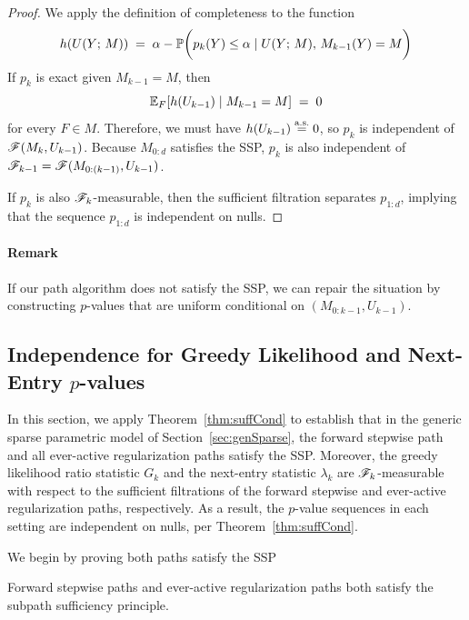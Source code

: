 \documentclass{article}
\begin{document}
\begin{proof}
We apply the definition of completeness to the function 
\[
h(U(Y; \, M)) \;=\; 
\alpha - \P\bigg(p_k(Y) \leq \alpha \mid U(Y; \, M), \, M_{k-1}(Y) = M\bigg)
\]
If $p_k$ is exact given $M_{k-1} = M$, then 
\[
\E_F[h(U_{k-1}) \mid M_{k-1}=M] \;=\; 0
\] 
for every $F\in M$. Therefore, we must have $h(U_{k-1})\eqAS 0$, so $p_k$ is independent of $\sF(M_k, U_{k-1})$. Because $M_{0:d}$ satisfies the SSP, $p_k$ is also independent of $\sF_{k-1} = \sF(M_{0:(k-1)}, U_{k-1})$.

If $p_k$ is also $\sF_k$-measurable, then the sufficient filtration separates $p_{1:d}$, implying that the sequence $p_{1:d}$ is independent on nulls.
\end{proof}

\paragraph{Remark} If our path algorithm does not satisfy the SSP, we can repair the situation by constructing $p$-values that are uniform conditional on $(M_{0:k-1},U_{k-1})$.

\subsection{Independence for Greedy Likelihood and Next-Entry $p$-values}\label{sec:indep-greedy-entry}

In this section, we apply Theorem~\ref{thm:suffCond} to establish that in the generic sparse parametric model of Section~\ref{sec:genSparse}, the forward stepwise path and all ever-active regularization paths satisfy the SSP. Moreover, the greedy likelihood ratio statistic $G_k$ and the next-entry statistic $\lambda_k$ are $\sF_k$-measurable with respect to the sufficient filtrations of the forward stepwise and ever-active regularization paths, respectively. As a result, the $p$-value sequences in each setting are independent on nulls, per Theorem~\ref{thm:suffCond}.

We begin by proving both paths satisfy the SSP
\begin{proposition}\label{prop:forwardSSP}
Forward stepwise paths and ever-active regularization paths both satisfy the subpath sufficiency principle.
\end{proposition}
\end{document}
